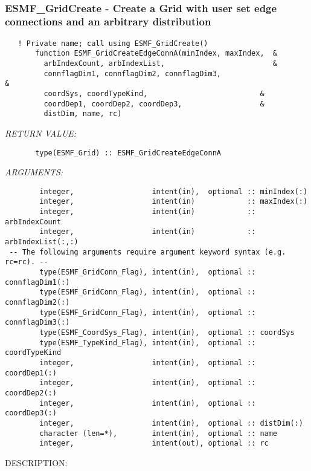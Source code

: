  
\mbox{}\hrulefill\ 
 
\subsubsection [ESMF\_GridCreate] {ESMF\_GridCreate - Create a Grid with user set edge connections and an arbitrary distribution}


 
\begin{verbatim}   ! Private name; call using ESMF_GridCreate()
       function ESMF_GridCreateEdgeConnA(minIndex, maxIndex,  &
         arbIndexCount, arbIndexList,                         &
         connflagDim1, connflagDim2, connflagDim3,                     &
         coordSys, coordTypeKind,                          &
         coordDep1, coordDep2, coordDep3,                  &
         distDim, name, rc)\end{verbatim}{\em RETURN VALUE:}
\begin{verbatim}       type(ESMF_Grid) :: ESMF_GridCreateEdgeConnA\end{verbatim}{\em ARGUMENTS:}
\begin{verbatim}        integer,                  intent(in),  optional :: minIndex(:)
        integer,                  intent(in)            :: maxIndex(:)
        integer,                  intent(in)            :: arbIndexCount
        integer,                  intent(in)            :: arbIndexList(:,:)
 -- The following arguments require argument keyword syntax (e.g. rc=rc). --
        type(ESMF_GridConn_Flag), intent(in),  optional :: connflagDim1(:)
        type(ESMF_GridConn_Flag), intent(in),  optional :: connflagDim2(:)
        type(ESMF_GridConn_Flag), intent(in),  optional :: connflagDim3(:)
        type(ESMF_CoordSys_Flag), intent(in),  optional :: coordSys
        type(ESMF_TypeKind_Flag), intent(in),  optional :: coordTypeKind
        integer,                  intent(in),  optional :: coordDep1(:)
        integer,                  intent(in),  optional :: coordDep2(:)
        integer,                  intent(in),  optional :: coordDep3(:)
        integer,                  intent(in),  optional :: distDim(:)
        character (len=*),        intent(in),  optional :: name
        integer,                  intent(out), optional :: rc\end{verbatim}
{\sf DESCRIPTION:\\ }


